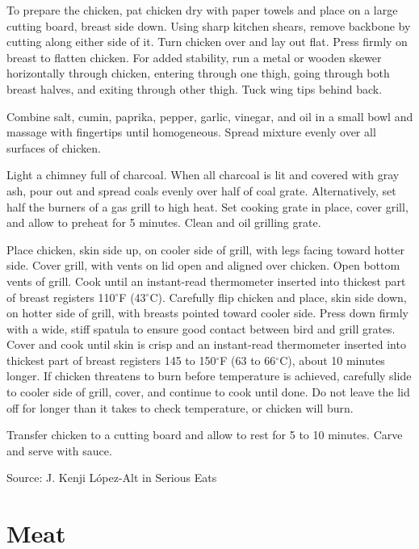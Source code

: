 \documentclass[letterpaper]{recipePMG}
\renewcommand{\deg}{$^\circ$}
\begin{document}
To prepare the chicken, pat chicken dry with paper towels and place on a large cutting board, breast side down. Using sharp kitchen shears, remove backbone by cutting along either side of it. Turn chicken over and lay out flat. Press firmly on breast to flatten chicken. For added stability, run a metal or wooden skewer horizontally through chicken, entering through one thigh, going through both breast halves, and exiting through other thigh. Tuck wing tips behind back.

Combine salt, cumin, paprika, pepper, garlic, vinegar, and oil in a small bowl and massage with fingertips until homogeneous. Spread mixture evenly over all surfaces of chicken. 

Light a chimney full of charcoal. When all charcoal is lit and covered with gray ash, pour out and spread coals evenly over half of coal grate. Alternatively, set half the burners of a gas grill to high heat. Set cooking grate in place, cover grill, and allow to preheat for 5 minutes. Clean and oil grilling grate. 

Place chicken, skin side up, on cooler side of grill, with legs facing toward hotter side. Cover grill, with vents on lid open and aligned over chicken. Open bottom vents of grill. Cook until an instant-read thermometer inserted into thickest part of breast registers 110\deg F (43\deg C). Carefully flip chicken and place, skin side down, on hotter side of grill, with breasts pointed toward cooler side. Press down firmly with a wide, stiff spatula to ensure good contact between bird and grill grates. Cover and cook until skin is crisp and an instant-read thermometer inserted into thickest part of breast registers 145 to 150\deg F (63 to 66\deg C), about 10 minutes longer. If chicken threatens to burn before temperature is achieved, carefully slide to cooler side of grill, cover, and continue to cook until done. Do not leave the lid off for longer than it takes to check temperature, or chicken will burn.

Transfer chicken to a cutting board and allow to rest for 5 to 10 minutes. Carve and serve with sauce. 

Source:  J. Kenji L\'{o}pez-Alt in Serious Eats

\chapter{Meat}

\end{document}
